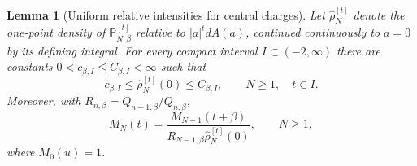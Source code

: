\documentclass[11pt,a4paper]{article}
\numberwithin{equation}{section}
\newtheorem{lemma}[theorem]{Lemma}
\theoremstyle{definition}
\theoremstyle{remark}
\begin{document}
\begin{lemma}[Uniform relative intensities for central charges]
\label{lem:general-charge-relative-intensity}
Let $\widehat\rho_{N}^{[t]}$ denote the one-point density of
$\mathbb P_{N,\beta}^{[t]}$ relative to $|a|^t dA(a)$, continued
continuously to $a=0$ by its defining integral.  For every compact
interval $I\subset(-2,\infty)$ there are constants
$0<c_{\beta,I}\le C_{\beta,I}<\infty$ such that
\begin{equation}
 c_{\beta,I}\le\widehat\rho_N^{[t]}(0)
               \le C_{\beta,I},\qquad N\ge1,\quad t\in I.
 \label{eq:general-charge-relative-bounds}
\end{equation}
Moreover, with $R_{n,\beta}=Q_{n+1,\beta}/Q_{n,\beta}$,
\begin{equation}
 M_N(t)=\frac{M_{N-1}(t+\beta)}
 {R_{N-1,\beta}\widehat\rho_N^{[t]}(0)},
 \qquad N\ge1,
 \label{eq:general-charge-recursion}
\end{equation}
where $M_0(u)=1$.
\end{lemma}
\end{document}
